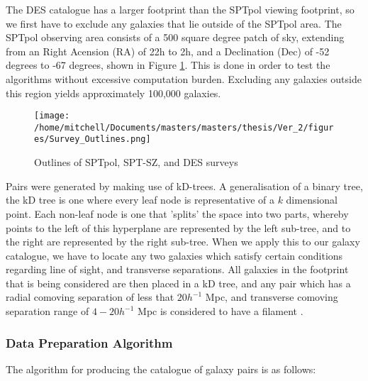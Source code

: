 \par The DES catalogue has a larger footprint than the SPTpol viewing footprint, so we first have to exclude any galaxies that lie outside of the SPTpol area. The SPTpol observing area consists of a 500 square degree patch of sky, extending from an Right Acension (RA) of 22h to 2h, and a Declination (Dec) of -52 degrees to -67 degrees, shown in Figure \ref{fig:surveys}. This is done in order to test the algorithms without excessive computation burden. Excluding any galaxies outside this region yields approximately 100,000 galaxies. 

\begin{figure}[h!]
\centering 
\texttt{[image: /home/mitchell/Documents/masters/masters/thesis/Ver\_2/figures/Survey\_Outlines.png]}
\caption{Outlines of SPTpol, SPT-SZ, and DES surveys}
\label{fig:surveys}
\end{figure}

Pairs were generated by making use of kD-trees. A generalisation of a binary tree, the kD tree is one where every leaf node is representative of a $k$ dimensional point. Each non-leaf node is one that 'splits' the space into two parts, whereby points to the left of this hyperplane are represented by the left sub-tree, and to the right are represented by the right sub-tree. When we apply this to our galaxy catalogue, we have to locate any two galaxies which satisfy certain conditions regarding line of sight, and transverse separations. All galaxies in the footprint that is being considered are then placed in a kD tree, and any pair which has a radial comoving separation of less that $20 h^{-1} $ Mpc, and transverse comoving separation range of $4 - 20 h^{-1} $ Mpc is considered to have a filament \citep{2016MNRAS.457.2391C,2005MNRAS.359..272C}.

\subsubsection{Data Preparation Algorithm}
\par The algorithm for producing the catalogue of galaxy pairs is as follows:

